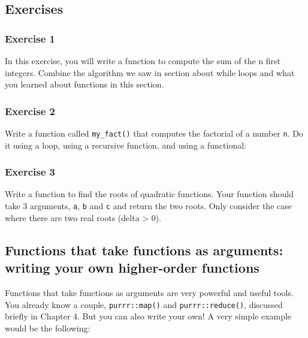 \documentclass[
]{article}
\begin{document}
\hypertarget{exercises-4}{%
\subsection{Exercises}\label{exercises-4}}

\hypertarget{exercise-1-4}{%
\subsubsection*{Exercise 1}\label{exercise-1-4}}

In this exercise, you will write a function to compute the sum of the n first integers. Combine the
algorithm we saw in section about while loops and what you learned about functions
in this section.

\hypertarget{exercise-2-2}{%
\subsubsection*{Exercise 2}\label{exercise-2-2}}

Write a function called \texttt{my\_fact()} that computes the factorial of a number \texttt{n}. Do it using a
loop, using a recursive function, and using a functional:

\hypertarget{exercise-3-2}{%
\subsubsection*{Exercise 3}\label{exercise-3-2}}

Write a function to find the roots of quadratic functions. Your function should take 3 arguments,
\texttt{a}, \texttt{b} and \texttt{c} and return the two roots. Only consider the case where there are two real roots
(delta \textgreater{} 0).

\hypertarget{functions-that-take-functions-as-arguments-writing-your-own-higher-order-functions}{%
\subsection{Functions that take functions as arguments: writing your own higher-order functions}\label{functions-that-take-functions-as-arguments-writing-your-own-higher-order-functions}}

Functions that take functions as arguments are very powerful and useful tools. You already know a
couple, \texttt{purrr::map()} and \texttt{purrr::reduce()}, discussed briefly in Chapter 4.
But you can also write your own! A very simple example would be the following:
\end{document}
